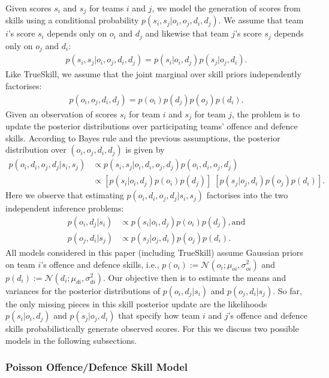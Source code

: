 \documentclass[runningheads,a4paper]{llncs}
\begin{document}
Given scores $s_i$ and $s_j$ for teams $i$ and $j$, we model the
generation of scores from skills using a conditional probability
$p(s_i, s_j|o_i, o_j, d_i, d_j)$. We assume that team $i$'s score
$s_i$ depends only on $o_i$ and $d_j$ and likewise that team $j$'s
score $s_j$ depends only on $o_j$ and $d_i$:
{\small
\begin{align}
  p(s_i, s_j|o_i, o_j, d_i, d_j) = p(s_i|o_i,  d_j)p( s_j|o_j, d_i).
\label{eq:sampleAssumption}
\end{align}}
Like TrueSkill, we assume that the joint marginal over skill
priors independently factorises:
{\small
\begin{align}
  p(o_i, o_j, d_i, d_j) = p(o_i) p(d_j) p(o_j) p(d_i).
\end{align}}
Given an observation of scores $s_i$ for team $i$ and $s_j$ for team
$j$, the problem is to update the posterior distributions over
participating teams' offence and defence skills.  According to
Bayes rule and the previous assumptions, the posterior distribution
over $(o_i, o_j, d_i, d_j)$ is given by
{\small
\begin{align}\label{eq:Bay}
    p(o_i, d_i, o_j, d_j | s_i, s_j) & \propto p( s_i, s_j |o_i, d_i, o_j, d_j ) p(o_i, d_i, o_j, d_j) \nonumber \\
        & \propto [p(s_i|o_i,d_j) p(o_i) p(d_j)] \; [p(s_j|o_j,d_i)  p(o_j) p(d_i)].
\end{align}}
Here we observe that estimating $p(o_i, d_i, o_j, d_j | s_i, s_j)$
factorises into the two independent inference problems:
{\small
\begin{align}
p(o_i, d_j|s_i) & \propto p(s_i|o_i,d_j) p(o_i) p(d_j), \text{and} \\
p(o_j, d_i|s_j) & \propto p(s_j|o_j,d_i) p(o_j) p(d_i).
\end{align}}
All models considered in this paper (including TrueSkill) assume
Gaussian priors on team $i$'s offence and
defence skills, i.e., $p(o_i):=\mathcal{N}(o_i; \mu_{oi}, \sigma_{oi}^2)$
and $p(d_i):=\mathcal{N}(d_i; \mu_{di}, \sigma_{di}^2)$.  Our objective
then is to estimate the means and variances for the posterior distributions
of $p(o_i, d_j|s_i)$ and $p( o_j, d_i |s_j)$.  So far, the only missing pieces
in this skill posterior update are the likelihoods $p(s_i|o_i,d_j)$
and $p(s_j|o_j,d_i)$ that specify how team $i$ and $j$'s offence and
defence skills probabilistically generate observed scores.  For this
we discuss two possible models in the following subsections.

\subsubsection{Poisson Offence/Defence Skill Model}
\end{document}
